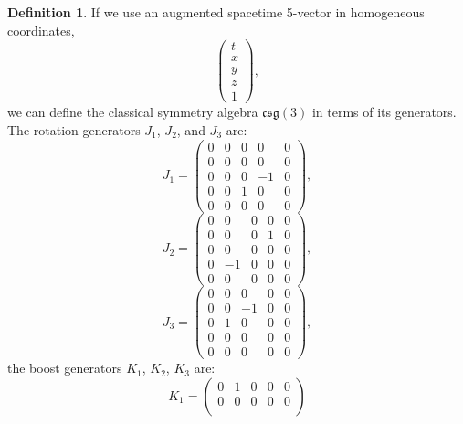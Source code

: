 \documentclass{amsart}
\theoremstyle{definition}
\newtheorem{definition}{Definition}[theorem]
\theoremstyle{remark}
\begin{document}
\begin{definition}
  If we use an augmented spacetime 5-vector in homogeneous coordinates,
  \begin{equation*}
    \begin{pmatrix}
      t \\
      x \\
      y \\
      z \\
      1
    \end{pmatrix},
  \end{equation*}
  we can define the classical symmetry algebra $\mathfrak{csg}(3)$ in terms of its generators. The rotation generators $J_1$, $J_2$, and $J_3$ are:
  \begin{equation*}
    J_1 =
    \begin{pmatrix}
      0 & 0 & 0 & 0 & 0 \\
      0 & 0 & 0 & 0 & 0 \\
      0 & 0 & 0 & -1 & 0 \\
      0 & 0 & 1 & 0 & 0 \\
      0 & 0 & 0 & 0 & 0
    \end{pmatrix},
  \end{equation*}
  \begin{equation*}
    J_2 =
    \begin{pmatrix}
      0 & 0 & 0 & 0 & 0 \\
      0 & 0 & 0 & 1 & 0 \\
      0 & 0 & 0 & 0 & 0 \\
      0 & -1 & 0 & 0 & 0 \\
      0 & 0 & 0 & 0 & 0
    \end{pmatrix},
  \end{equation*}
  \begin{equation*}
    J_3 =
    \begin{pmatrix}
      0 & 0 & 0 & 0 & 0 \\
      0 & 0 & -1 & 0 & 0 \\
      0 & 1 & 0 & 0 & 0 \\
      0 & 0 & 0 & 0 & 0 \\
      0 & 0 & 0 & 0 & 0
    \end{pmatrix},
  \end{equation*}
  the boost generators $K_1$, $K_2$, $K_3$ are:
  \begin{equation*}
    K_1 =
    \begin{pmatrix}
      0 & 1 & 0 & 0 & 0 \\
      0 & 0 & 0 & 0 & 0 \\

\end{pmatrix}
\end{equation*}
\end{definition}
\end{document}
